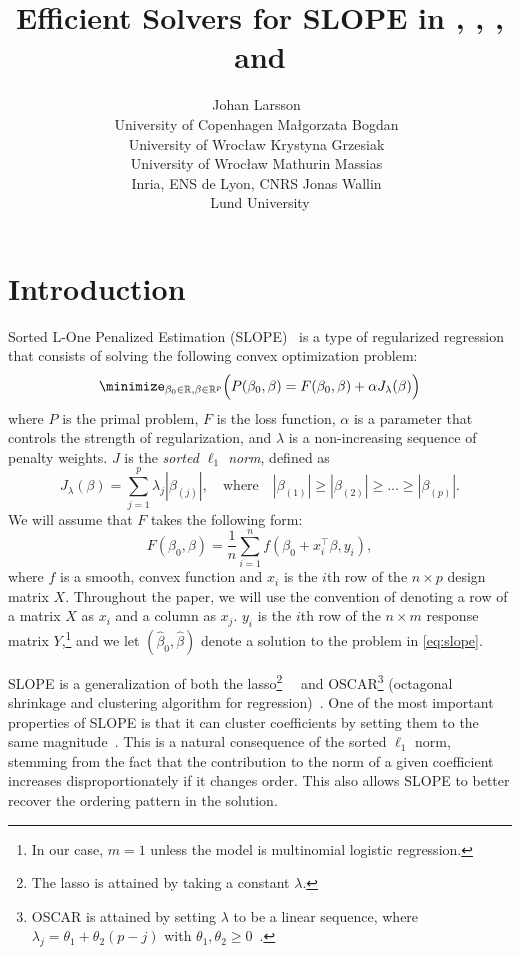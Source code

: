 \documentclass[article]{jss}
\author{
  Johan Larsson~\orcidlink{0000-0002-4029-5945}\\University of Copenhagen
  \And
  Ma\l{}gorzata Bogdan~\orcidlink{0000-0001-6355-8261}\\University of Wroc\l{}aw
  \And
  Krystyna Grzesiak~\orcidlink{0000-0003-2581-7722}\\University of Wroc\l{}aw
  \AND
  Mathurin Massias~\orcidlink{0000-0002-8950-0356}\\Inria, ENS de Lyon, CNRS
  \And
  Jonas Wallin~\orcidlink{0000-0003-0381-6593}\\Lund University
}
\title{Efficient Solvers for SLOPE in \proglang{R}, \proglang{Python}, \proglang{Julia}, and \proglang{C++}}
\begin{document}
\section{Introduction}

Sorted L-One Penalized Estimation
(SLOPE)~\citep{bogdan2013,zeng2014,bogdan2015} is a type of regularized
regression that consists of solving the following convex optimization problem:
\begin{equation}
  \label{eq:slope}
  \minimize_{\beta_0 \in \mathbb{R},\beta \in \mathbb{R}^p}
  \Big(
  P(\beta_0,\beta)
  = F(\beta_0, \beta) + \alpha J_{\lambda}(\beta)
  \Big)
\end{equation}
%
where \(P\) is the primal problem, \(F\) is the loss function, \(\alpha\) is a
parameter that controls the strength of regularization, and \(\lambda\) is a
non-increasing sequence of penalty weights. \(J\) is the \emph{sorted $\ell_1$
  norm}, defined as
%
\begin{equation}
  J_{\lambda}(\beta) = \sum_{j=1}^p \lambda_j |\beta_{(j)}|, \quad
  \text{where}\quad |\beta_{(1)}| \geq |\beta_{(2)}| \geq \ldots \geq
  |\beta_{(p)}|.
\end{equation}
%
We will assume that \(F\) takes the following form:
%
\[
  F(\beta_0, \beta) = \frac{1}{n} \sum_{i=1}^n f(\beta_0 + x_i^\intercal \beta, y_i),
\]
%
where \(f\) is a smooth, convex function and \(x_i\) is the \(i\)th row of the
\(n \times p\) design matrix \(X\). Throughout the paper, we will use the
convention of denoting a row of a matrix \(X\) as \(x_i\) and a column as
\(x_j\). \(y_i\) is the \(i\)th row of the \(n \times m\) response matrix
\(Y\),\footnote{In our case, \(m = 1\) unless the model is multinomial
  logistic regression.}
and we let \((\hat{\beta}_0,
\hat{\beta})\) denote a solution to the problem in \autoref{eq:slope}.

SLOPE is a generalization of both the lasso\footnote{The lasso is attained by
  taking a constant
  \(\lambda\).}~~\citep{santosa1986,donoho1994,donoho1995,tibshirani1996} and
OSCAR\footnote{OSCAR is attained by setting \(\lambda\) to be a linear
  sequence, where \(\lambda_j = \theta_1 + \theta_2(p - j)\) with \(\theta_1,
  \theta_2 \geq 0\)~\citep{figueiredo2014}.} (octagonal shrinkage and clustering
algorithm for regression)~\citep{bondell2008}. One of the most important
properties of SLOPE is that it can cluster coefficients by setting them to the
same magnitude~\citep{figueiredo2016,bogdan2022}. This is a natural consequence
of the sorted \(\ell_1\) norm, stemming from the fact that the contribution to
the norm of a given coefficient increases disproportionately if it changes
order. This also allows SLOPE to better recover the ordering pattern in the
solution.
\end{document}

